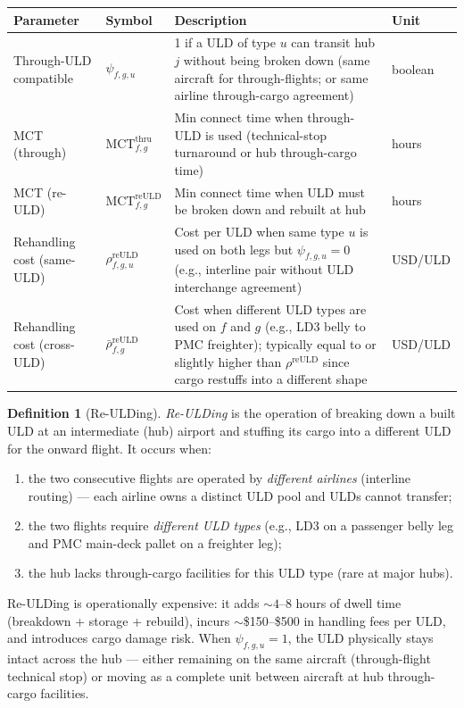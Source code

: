 \documentclass[11pt,a4paper]{article}
\theoremstyle{definition}
\newtheorem{defn}{Definition}
\begin{document}
\begin{center}
\begin{tabular}{llp{7cm}l}
\toprule
Parameter & Symbol & Description & Unit \\
\midrule
Through-ULD compatible & $\psi_{f,g,u}$ & 1 if a ULD of type $u$ can transit hub $j$ without being broken down (same aircraft for through-flights; or same airline through-cargo agreement) & boolean \\
MCT (through) & $\text{MCT}_{f,g}^{\text{thru}}$ & Min connect time when through-ULD is used (technical-stop turnaround or hub through-cargo time) & hours \\
MCT (re-ULD) & $\text{MCT}_{f,g}^{\text{reULD}}$ & Min connect time when ULD must be broken down and rebuilt at hub & hours \\
Rehandling cost (same-ULD) & $\rho_{f,g,u}^{\text{reULD}}$ & Cost per ULD when same type $u$ is used on both legs but $\psi_{f,g,u}=0$ (e.g., interline pair without ULD interchange agreement) & USD/ULD \\
Rehandling cost (cross-ULD) & $\bar{\rho}_{f,g}^{\text{reULD}}$ & Cost when different ULD types are used on $f$ and $g$ (e.g., LD3 belly to PMC freighter); typically equal to or slightly higher than $\rho^{\text{reULD}}$ since cargo restuffs into a different shape & USD/ULD \\
\bottomrule
\end{tabular}
\end{center}

\begin{defn}[Re-ULDing]
\emph{Re-ULDing} is the operation of breaking down a built ULD at an intermediate (hub)
airport and stuffing its cargo into a different ULD for the onward flight. It occurs when:
\begin{enumerate}[noitemsep,label=(\alph*)]
  \item the two consecutive flights are operated by \emph{different airlines} (interline
        routing) — each airline owns a distinct ULD pool and ULDs cannot transfer;
  \item the two flights require \emph{different ULD types} (e.g., LD3 on a passenger belly
        leg and PMC main-deck pallet on a freighter leg);
  \item the hub lacks through-cargo facilities for this ULD type (rare at major hubs).
\end{enumerate}
Re-ULDing is operationally expensive: it adds $\sim 4$--$8$ hours of dwell time
(breakdown + storage + rebuild), incurs $\sim$\$150--\$500 in handling fees per ULD, and
introduces cargo damage risk. When $\psi_{f,g,u} = 1$, the ULD physically stays intact
across the hub — either remaining on the same aircraft (through-flight technical stop) or
moving as a complete unit between aircraft at hub through-cargo facilities.
\end{defn}
\end{document}
